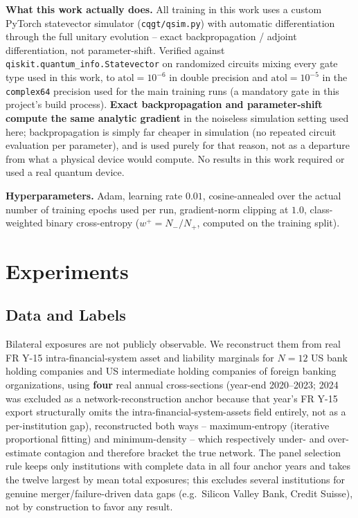 \documentclass[journal]{IEEEtran}
\begin{document}
\textbf{What this work actually does.} All training in this work uses a
custom PyTorch statevector simulator (\texttt{cqgt/qsim.py}) with
automatic differentiation through the full unitary evolution -- exact
backpropagation / adjoint differentiation, not parameter-shift. Verified
against \texttt{qiskit.quantum\_info.Statevector} on randomized circuits
mixing every gate type used in this work, to $\mathrm{atol}=10^{-6}$ in
double precision and $\mathrm{atol}=10^{-5}$ in the \texttt{complex64}
precision used for the main training runs (a mandatory gate in this
project's build process). \textbf{Exact backpropagation and
parameter-shift compute the same analytic gradient} in the noiseless
simulation setting used here; backpropagation is simply far cheaper in
simulation (no repeated circuit evaluation per parameter), and is used
purely for that reason, not as a departure from what a physical device
would compute. No results in this work required or used a real quantum
device.

\textbf{Hyperparameters.} Adam, learning rate $0.01$, cosine-annealed
over the actual number of training epochs used per run, gradient-norm
clipping at $1.0$, class-weighted binary cross-entropy ($w^+ = N_-/N_+$,
computed on the training split).

\section{Experiments}

\subsection{Data and Labels}
\label{sec:data}

Bilateral exposures are not publicly observable. We reconstruct them from
real FR Y-15 intra-financial-system asset and liability marginals for
$N=12$ US bank holding companies and US intermediate holding companies of
foreign banking organizations, using \textbf{four} real annual
cross-sections (year-end 2020--2023; 2024 was excluded as a
network-reconstruction anchor because that year's FR Y-15 export
structurally omits the intra-financial-system-assets field entirely, not
as a per-institution gap), reconstructed both ways -- maximum-entropy
(iterative proportional fitting) and minimum-density
\cite{anand2015} -- which respectively under- and over-estimate
contagion and therefore bracket the true network. The panel selection
rule keeps only institutions with complete data in all four anchor
years and takes the twelve largest by mean total exposures; this
excludes several institutions for genuine merger/failure-driven data
gaps (e.g.\ Silicon Valley Bank, Credit Suisse), not by construction to
favor any result.
\end{document}
